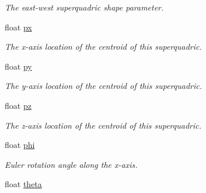 \begin{DoxyCompactItemize}
\begin{DoxyCompactList}\small\item\em The east-\/west superquadric shape parameter. \end{DoxyCompactList}\item 
\hypertarget{classope_1_1_s_q_parameters_a903f4ba46a728468b11dc4be64a21618}{float \hyperlink{classope_1_1_s_q_parameters_a903f4ba46a728468b11dc4be64a21618}{px}}\label{classope_1_1_s_q_parameters_a903f4ba46a728468b11dc4be64a21618}

\begin{DoxyCompactList}\small\item\em The x-\/axis location of the centroid of this superquadric. \end{DoxyCompactList}\item 
\hypertarget{classope_1_1_s_q_parameters_af25c86e8578c0e5d36f7cf4808436808}{float \hyperlink{classope_1_1_s_q_parameters_af25c86e8578c0e5d36f7cf4808436808}{py}}\label{classope_1_1_s_q_parameters_af25c86e8578c0e5d36f7cf4808436808}

\begin{DoxyCompactList}\small\item\em The y-\/axis location of the centroid of this superquadric. \end{DoxyCompactList}\item 
\hypertarget{classope_1_1_s_q_parameters_acd2df8f904daa779e6679caf9057480d}{float \hyperlink{classope_1_1_s_q_parameters_acd2df8f904daa779e6679caf9057480d}{pz}}\label{classope_1_1_s_q_parameters_acd2df8f904daa779e6679caf9057480d}

\begin{DoxyCompactList}\small\item\em The z-\/axis location of the centroid of this superquadric. \end{DoxyCompactList}\item 
\hypertarget{classope_1_1_s_q_parameters_a4e7f57a684ac969a5c6569de75fa1423}{float \hyperlink{classope_1_1_s_q_parameters_a4e7f57a684ac969a5c6569de75fa1423}{phi}}\label{classope_1_1_s_q_parameters_a4e7f57a684ac969a5c6569de75fa1423}

\begin{DoxyCompactList}\small\item\em Euler rotation angle along the x-\/axis. \end{DoxyCompactList}\item 
\hypertarget{classope_1_1_s_q_parameters_a0c39d948d2f13edc1087df6b59a5b281}{float \hyperlink{classope_1_1_s_q_parameters_a0c39d948d2f13edc1087df6b59a5b281}{theta}}\label{classope_1_1_s_q_parameters_a0c39d948d2f13edc1087df6b59a5b281}


\end{DoxyCompactItemize}
